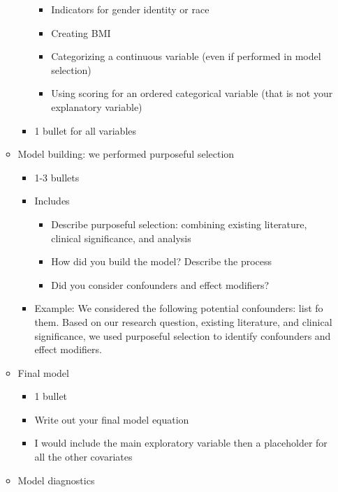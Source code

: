 \documentclass[
  letterpaper,
  DIV=11,
  numbers=noendperiod]{scrartcl}
\providecommand{\tightlist}{%
  \setlength{\itemsep}{0pt}\setlength{\parskip}{0pt}}\usepackage{longtable,booktabs,array}
\begin{document}
\begin{itemize}
\begin{itemize}
\begin{itemize}
      \begin{itemize}
      \tightlist
      \item
        Indicators for gender identity or race
      \item
        Creating BMI
      \item
        Categorizing a continuous variable (even if performed in model
        selection)
      \item
        Using scoring for an ordered categorical variable (that is not
        your explanatory variable)
      \end{itemize}
    \item
      1 bullet for all variables
    \end{itemize}
  \item
    Model building: we performed purposeful selection

    \begin{itemize}
    \tightlist
    \item
      1-3 bullets
    \item
      Includes

      \begin{itemize}
      \tightlist
      \item
        Describe purposeful selection: combining existing literature,
        clinical significance, and analysis
      \item
        How did you build the model? Describe the process
      \item
        Did you consider confounders and effect modifiers?
      \end{itemize}
    \item
      Example: We considered the following potential confounders: list
      fo them. Based on our research question, existing literature, and
      clinical significance, we used purposeful selection to identify
      confounders and effect modifiers.
    \end{itemize}
  \item
    Final model

    \begin{itemize}
    \tightlist
    \item
      1 bullet
    \item
      Write out your final model equation
    \item
      I would include the main exploratory variable then a placeholder
      for all the other covariates
    \end{itemize}
  \item
    Model diagnostics


\end{itemize}
\end{itemize}
\end{document}
